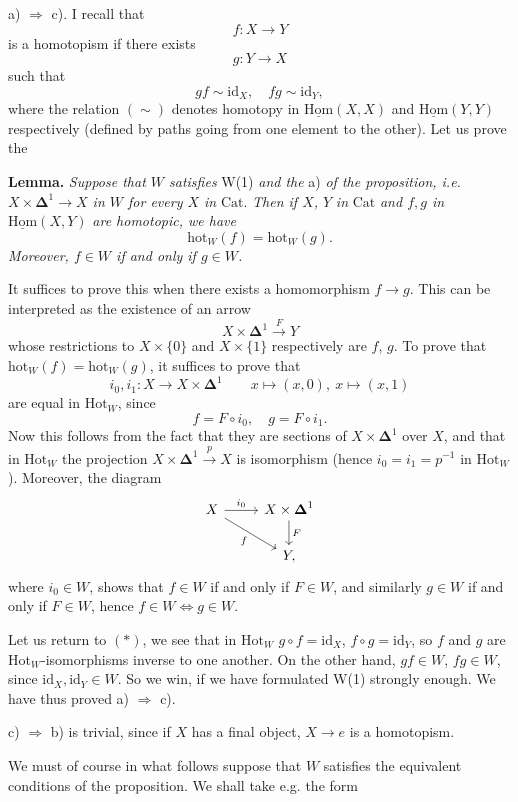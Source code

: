 \documentclass[11pt]{article}
\newcommand{\printedpage}[1]{\marginpar{\footnotesize p.~#1}}
\newcommand{\msp}[1]{\marginpar{\footnotesize [#1]}}
\newcommand{\Cat}{\mathrm{Cat}}
\newcommand{\Dl}{\boldsymbol{\Delta}}
\newcommand{\fl}{\longrightarrow}
\newcommand{\Hot}{\mathrm{Hot}}
\newcommand{\hot}{\mathrm{hot}}
\newcommand{\uHom}{\underline{\mathrm{Hom}}}
\newcommand{\id}{\mathrm{id}}
\begin{document}
a) $\Longrightarrow$ c). I recall that
\[ f : X \fl Y \]
\msp{page 2}
is a homotopism if there exists
\[ g : Y \fl X \]
such that
\[ gf \sim \id_X, \quad fg \sim \id_Y, \tag*{$(*)$} \]
where the relation $(\sim)$ denotes homotopy in $\uHom(X,X)$ and $\uHom(Y,Y)$ respectively (defined by paths going from one element to the other). Let us prove the

\textbf{Lemma.} \textit{Suppose that $W$ satisfies} W(1) \textit{and the} a) \textit{of the proposition, i.e. $X \times \Dl^1 \fl X$ in $W$ for every $X$ in} $\Cat$. \textit{Then if $X$, $Y$} \textit{in} $\Cat$ \textit{and $f, g$ in} $\uHom(X,Y)$ \textit{are homotopic, we have}
\[ \hot_W(f) = \hot_W(g). \]
\textit{Moreover, $f \in W$ if and only if $g \in W$.}

It suffices to prove this when there exists a homomorphism $f \fl g$. This can be interpreted as the existence of an arrow
\[ X \times \Dl^1 \xrightarrow{F} Y \]
whose restrictions to $X \times \{0\}$ and $X \times \{1\}$ respectively are $f$, $g$. To prove that $\hot_W(f) = \hot_W(g)$, it suffices to prove that
\[ i_0, i_1 : X \fl X \times \Dl^1 \qquad x \longmapsto (x,0),\ x \longmapsto (x,1) \]
\printedpage{3}
are equal in $\Hot_W$, since
\[ f = F \circ i_0, \quad g = F \circ i_1. \]
Now this follows from the fact that they are sections of $X \times \Dl^1$ over $X$, and that in $\Hot_W$ the projection $X \times \Dl^1 \xrightarrow{p} X$ is isomorphism (hence $i_0 = i_1 = p^{-1}$ in $\Hot_W$). Moreover, the diagram
\[
\begin{tikzcd}
X \arrow[r, "i_0"] \arrow[dr, "f"'] & X \times \Dl^1 \arrow[d, "F"] \\
& Y,
\end{tikzcd}
\]
where $i_0 \in W$, shows that $f \in W$ if and only if $F \in W$, and similarly $g \in W$ if and only if $F \in W$, hence $f \in W \Longleftrightarrow g \in W$.

Let us return to $(*)$, we see that in $\Hot_W$ $g \circ f = \id_X$, $f \circ g = \id_Y$, so $f$ and $g$ are $\Hot_W$-isomorphisms inverse to one another. On the other hand, $gf \in W$, $fg \in W$, since $\id_X, \id_Y \in W$. So we win, if we have formulated W(1) strongly enough. We have thus proved a) $\Longrightarrow$ c).

c) $\Longrightarrow$ b) is trivial, since if $X$ has a final object, $X \fl e$ is a homotopism.

\msp{page 3}

We must of course in what follows suppose that $W$ satisfies the equivalent conditions of the proposition. We shall take e.g. the form
\end{document}
